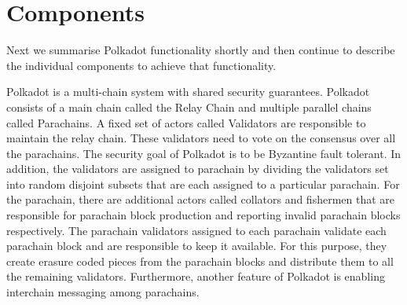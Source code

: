 \section{Components}
Next we summarise Polkadot functionality shortly and then continue to describe the individual components to achieve that functionality. 

Polkadot is a multi-chain system with shared security guarantees. Polkadot consists of a main chain called the Relay Chain and multiple parallel chains
 called Parachains. A fixed set of actors called Validators are responsible to maintain the relay chain. These validators need to vote on the consensus over all the parachains.
The security goal of Polkadot is to be Byzantine fault tolerant. In addition, the validators are assigned to parachain by dividing the validators set into
random disjoint subsets that are each assigned to a particular parachain. For the parachain, there are additional actors called collators and fishermen that are
responsible for parachain block production and reporting invalid parachain blocks respectively. The parachain validators assigned to each parachain validate each parachain block and are
responsible to keep it available. For this purpose, they create erasure coded pieces from the parachain blocks and distribute
them to all the remaining validators. Furthermore, another feature of Polkadot is enabling interchain messaging among parachains.






%



